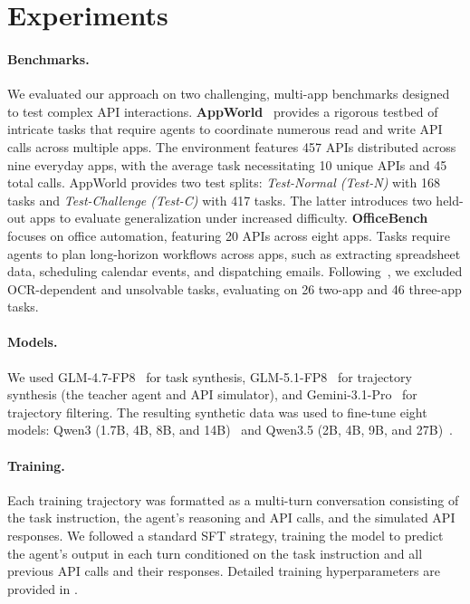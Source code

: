 
\section{Experiments}
\paragraph{Benchmarks.} We evaluated our approach on two challenging, multi-app benchmarks designed to test complex API interactions. \textbf{AppWorld}~\citep{appworld} provides a rigorous testbed of intricate tasks that require agents to coordinate numerous read and write API calls across multiple apps. The environment features 457 APIs distributed across nine everyday apps, with the average task necessitating 10 unique APIs and 45 total calls. AppWorld provides two test splits: \textit{Test-Normal (Test-N)} with 168 tasks and \textit{Test-Challenge (Test-C)} with 417 tasks. The latter introduces two held-out apps to evaluate generalization under increased difficulty. \textbf{OfficeBench}~\citep{wang2024officebench} focuses on office automation, featuring 20 APIs across eight apps. Tasks require agents to plan long-horizon workflows across apps, such as extracting spreadsheet data, scheduling calendar events, and dispatching emails. Following~\citet{li2025simulating}, we excluded OCR-dependent and unsolvable tasks, evaluating on 26 two-app and 46 three-app tasks. 

\paragraph{Models.} We used GLM-4.7-FP8~\citep{glm-4.7} for task synthesis, GLM-5.1-FP8~\citep{glm} for trajectory synthesis (the teacher agent and API simulator), and Gemini-3.1-Pro~\citep{gemini31pro2026} for trajectory filtering. The resulting synthetic data was used to fine-tune eight models: Qwen3 (1.7B, 4B, 8B, and 14B)~\citep{qwen3} and Qwen3.5 (2B, 4B, 9B, and 27B)~\citep{qwen35}.


\paragraph{Training.} Each training trajectory was formatted as a multi-turn conversation consisting of the task instruction, the agent's reasoning and API calls, and the simulated API responses. We followed a standard SFT strategy, training the model to predict the agent's output in each turn conditioned on the task instruction and all previous API calls and their responses. Detailed training hyperparameters are provided in .


